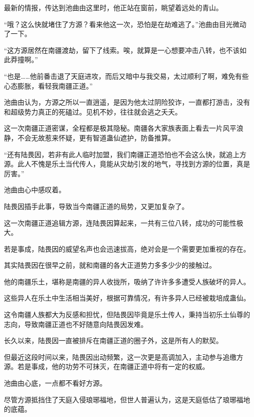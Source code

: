 
\begin{this_body}



最新的情报，传达到池曲由这里时，他正站在窗前，眺望着远处的青山。

“哦？这么快就堵住了方源？看来他这一次，恐怕是在劫难逃了。”池曲由目光微动了一下。

“这方源居然在南疆渡劫，留下了线索。唉，就算是一心想要冲击八转，也不该如此莽撞啊。”

“也是……他前番击退了天庭进攻，而后又暗中与我交易，太过顺利了啊，难免有些心态膨胀，看轻我南疆正道。”

池曲由认为，方源之所以一直逍遥，是因为他太过阴险狡诈，一直都打游击，没有和超级势力真正的死磕过。见机不妙，往往就会逃之夭夭。

这一次南疆正道密谋，全程都是极其隐秘。南疆各大家族表面上看去一片风平浪静，不会无故惹来怀疑，更有智道蛊仙遮护，防备推算。

“还有陆畏因，若非有此人临时加盟，我们南疆正道恐怕也不会这么快，就追上方源。此人不愧是乐土当代传人，竟能从灾劫引发的地气，寻找到方源的位置，真是厉害。”

池曲由心中感叹着。

陆畏因插手此事，导致当今南疆正道的局势，又更加复杂了。

这一次南疆正道追辑方源，连陆畏因算起来，一共有三位八转，成功的可能性极大。

若是事成，陆畏因的威望名声也会迅速拔高，绝对会是一个需要更加重视的存在。

其实陆畏因在很早之前，就和南疆的各大正道势力多多少少的接触过。

他的南疆乐土，堪称是南疆的异人收拢所，吸纳了许许多多遭受人族破坏的异人。

这些异人在乐土中生活相当美好，根据可靠情况，有许多异人已经被栽培成蛊仙。

这令南疆人族都大为反感和担忧，但陆畏因毕竟是乐土传人，秉持当初乐土仙尊的志向，导致南疆正道也不好随意向陆畏因发难。

长久以来，陆畏因一直被排斥在南疆正道的圈子外，这是所有人的默契。

但最近这段时间以来，陆畏因出动频繁，这一次更是高调加入，主动参与追缴方源。若是事成，他的功劳不可抹灭，在南疆正道中将有一定的权威。

池曲由心底，一点都不看好方源。

尽管方源抵挡住了天庭入侵琅琊福地，但世人普遍认为，这是天庭低估了琅琊福地的底蕴。


\end{this_body}
